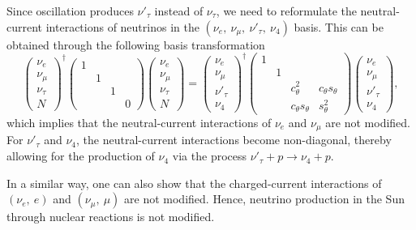 \documentclass[aps,prd,twocolumn,preprintnumbers,superscriptaddress,nofootinbib]{revtex4-1}
\begin{document}
Since oscillation produces $\nu'_{\tau}$ instead of $\nu_{\tau}$,
we need to reformulate the neutral-current interactions of neutrinos
in the $(\nu_{e},\ \nu_{\mu},\ \nu'_{\tau},\ \nu_{4})$ basis.
This can be obtained through the following basis transformation
\begin{equation}
\left(\begin{array}{c}
\nu_{e}\\
\nu_{\mu}\\
\nu_{\tau}\\
N
\end{array}\right)^{\dagger}\left(\begin{array}{cccc}
1\\
 & 1\\
 &  & 1\\
 &  &  & 0
\end{array}\right)\left(\begin{array}{c}
\nu_{e}\\
\nu_{\mu}\\
\nu_{\tau}\\
N
\end{array}\right)=\left(\begin{array}{c}
\nu_{e}\\
\nu_{\mu}\\
\nu'_{\tau}\\
\nu_{4}
\end{array}\right)^{\dagger}\left(\begin{array}{cccc}
1\\
 & 1\\
 &  & c_{\theta}^{2} & c_{\theta}s_{\theta}\\
 &  & c_{\theta}s_{\theta} & s_{\theta}^{2}
\end{array}\right)\left(\begin{array}{c}
\nu_{e}\\
\nu_{\mu}\\
\nu'_{\tau}\\
\nu_{4}
\end{array}\right),\label{eq:-33}
\end{equation}
which implies that the neutral-current interactions of $\nu_{e}$
and $\nu_{\mu}$ are not modified. For $\nu'_{\tau}$ and $\nu_{4}$,
the neutral-current interactions become non-diagonal, thereby allowing
for the production of $\nu_{4}$ via the process $\nu'_{\tau}+p\to\nu{}_{4}+p$. 

In a similar way, one can also show that the charged-current interactions
of $(\nu_{e},\ e)$ and $(\nu_{\mu},\ \mu)$ are not modified. Hence,
neutrino production in the Sun through nuclear reactions
is not modified. 
\end{document}
